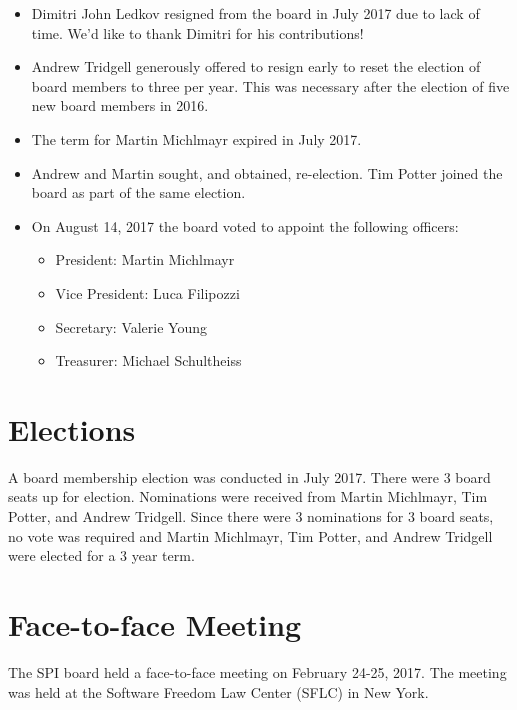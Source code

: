 \documentclass[letterpaper]{report}
\begin{document}
\begin{itemize}

\item Dimitri John Ledkov resigned from the board in July 2017 due to lack
of time.  We'd like to thank Dimitri for his contributions!

\item Andrew Tridgell generously offered to resign early to reset the
election of board members to three per year. This was necessary after the
election of five new board members in 2016.

\item The term for Martin Michlmayr expired in July 2017.

\item Andrew and Martin sought, and obtained, re-election.  Tim Potter
joined the board as part of the same election.

\item On August 14, 2017 the board voted to appoint the following
officers:

\begin{itemize}
\item President: Martin Michlmayr
\item Vice President: Luca Filipozzi
\item Secretary: Valerie Young
\item Treasurer: Michael Schultheiss
\end{itemize}

\end{itemize}

\section{Elections}

A board membership election was conducted in July 2017.  There were 3 board
seats up for election.  Nominations were received from Martin Michlmayr,
Tim Potter, and Andrew Tridgell.  Since there were 3 nominations for 3
board seats, no vote was required and Martin Michlmayr, Tim Potter, and
Andrew Tridgell were elected for a 3 year term.

\section{Face-to-face Meeting}

The SPI board held a face-to-face meeting on February 24-25, 2017.
The meeting was held at the Software Freedom Law Center (SFLC) in New
York.
\end{document}
